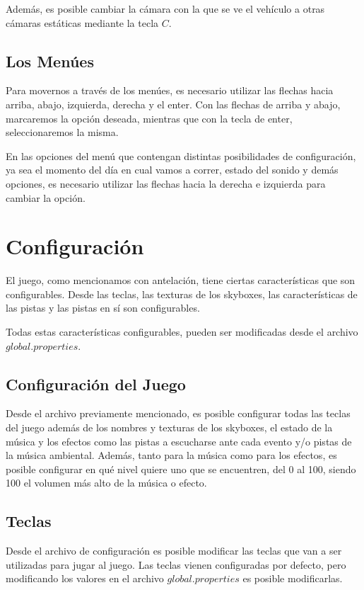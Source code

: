 \documentclass[a4paper,10pt]{article}
\begin{document}
Adem\'as, es posible cambiar la c\'amara con la que se ve el veh\'iculo a otras
c\'amaras est\'aticas mediante la tecla $C$.

\subsection{Los Men\'ues}
Para movernos a trav\'es de los men\'ues, es necesario utilizar las flechas
hacia
arriba, abajo, izquierda, derecha y el enter.  Con las flechas de arriba y
abajo, marcaremos la opci\'on deseada, mientras que con la tecla de enter,
seleccionaremos la misma.

En las opciones del men\'u que contengan distintas posibilidades de
configuraci\'on, ya sea el momento del d\'ia en cual vamos a correr, estado del
sonido y dem\'as opciones, es necesario utilizar las flechas hacia la derecha e
izquierda para cambiar la opci\'on.
\section{Configuraci\'on}
\label{configuracion}
El juego, como mencionamos con antelaci\'on, tiene ciertas caracter\'isticas
que
son configurables.  Desde las teclas, las texturas de los skyboxes, las
caracter\'isticas de las pistas y las pistas en s\'i son configurables.

Todas estas caracter\'isticas configurables, pueden ser modificadas desde el
archivo $global.properties$.

\subsection{Configuraci\'on del Juego}

Desde el archivo previamente mencionado, es posible configurar todas las teclas
del juego adem\'as de los nombres y texturas de los skyboxes, el estado de la
m\'usica y los efectos como las pistas a escucharse ante cada evento y/o pistas
de la m\'usica ambiental.  Adem\'as, tanto para la m\'usica como para los
efectos,
es
posible configurar en qu\'e nivel quiere uno que se encuentren, del 0 al 100,
siendo 100 el volumen m\'as alto de la m\'usica o efecto.

\subsection{Teclas}

Desde el archivo de configuraci\'on es posible modificar las teclas que van a
ser utilizadas para jugar al juego.  Las teclas vienen configuradas por
defecto, pero modificando los valores en el archivo $global.properties$ es
posible modificarlas.
\end{document}

